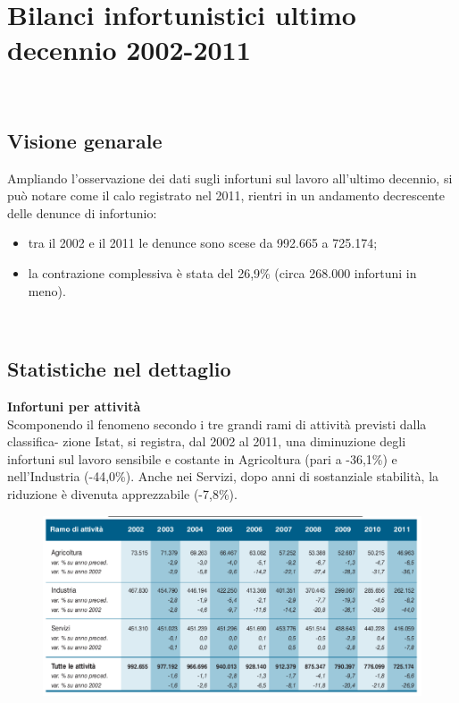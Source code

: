 \ \ \
\section{Bilanci infortunistici ultimo decennio 2002-2011}
\ \
\subsection{Visione genarale}

Ampliando l'osservazione dei dati sugli infortuni sul lavoro all'ultimo decennio, si può notare come il calo registrato nel 2011, rientri in un andamento decrescente delle denunce di infortunio:
\begin{itemize}
\item tra il 2002 e il 2011 le denunce sono scese da 992.665 a 725.174;
\item la contrazione complessiva è stata del 26,9\% (circa 268.000 infortuni in meno).
\end{itemize}



\ \
\subsection{Statistiche nel dettaglio}

\textbf{Infortuni per attività}\\
Scomponendo il fenomeno secondo i tre grandi rami di attività previsti dalla classifica-
zione Istat, si registra, dal 2002 al 2011, una diminuzione degli infortuni sul lavoro sensibile e costante in Agricoltura (pari a -36,1\%) e nell’Industria (-44,0\%). Anche nei
Servizi, dopo anni di sostanziale stabilità, la riduzione è divenuta apprezzabile (-7,8\%).



\begin{figure}[H]
\centering
\includegraphics[scale=0.5]{images/analisiDiMercato/infortuniDecennioPerGestione1}
\end{figure}

